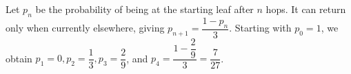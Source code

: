 Let $p_n$ be the probability of being at the starting leaf after $n$ hops. It can return only when currently elsewhere, giving $p_{n+1}=\dfrac{1-p_n}{3}$. Starting with $p_0=1$, we obtain $p_1=0,p_2=\dfrac{1}{3},p_3=\dfrac{2}{9}$, and $p_4=\dfrac{1-\dfrac{2}{9}}{3}=\boxed{\dfrac{7}{27}}$.
